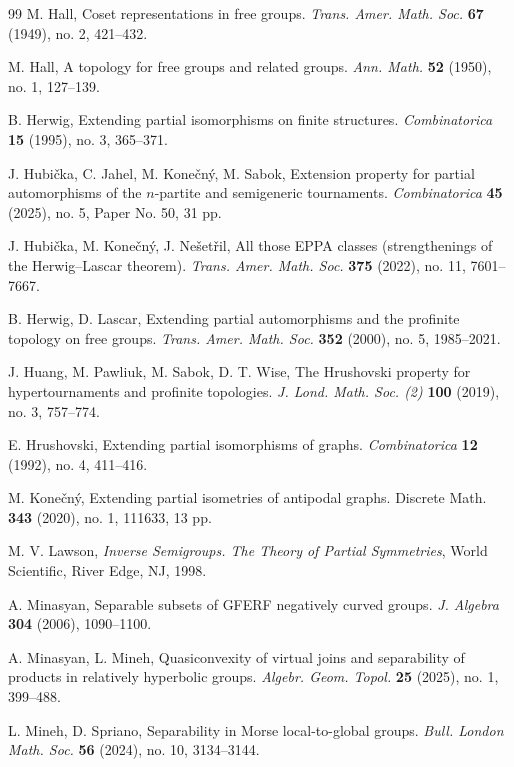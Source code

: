 \documentclass[10pt,a4paper]{amsart}
\theoremstyle{definition}
\theoremstyle{definition}
\numberwithin{equation}{section}
\begin{document}
\begin{thebibliography}{99}
M. Hall, 
Coset representations in free groups. \textit{Trans. Amer. Math. Soc.} {\bf 67} (1949), no. 2, 421--432.

M. Hall,
A topology for free groups and related groups.
\textit{Ann. Math.} {\bf 52} (1950), no. 1, 127--139.

B. Herwig, 
Extending partial isomorphisms on finite structures.
\textit{Combinatorica} {\bf 15} (1995), no. 3, 365--371.

J. Hubi\v{c}ka, C. Jahel, M. Kone\v{c}n\'{y}, M. Sabok,
Extension property for partial automorphisms of the $n$-partite and semigeneric tournaments.
\textit{Combinatorica} {\bf 45} (2025), no. 5, Paper No. 50, 31 pp.

J. Hubi\v{c}ka, M. Kone\v{c}n\'{y}, J. Ne\v{s}et\v{r}il,
All those EPPA classes (strengthenings of the Herwig--Lascar theorem).
\textit{Trans. Amer. Math. Soc.} {\bf 375} (2022), no. 11, 7601--7667.

B. Herwig, D. Lascar, Extending partial automorphisms and the profinite topology on free
groups. \textit{Trans. Amer. Math. Soc.} {\bf 352} (2000), no. 5, 1985--2021.

J. Huang, M. Pawliuk, M. Sabok, D. T. Wise, 
The Hrushovski property for hypertournaments and profinite topologies.
\textit{J. Lond. Math. Soc. (2)} {\bf 100} (2019), no. 3, 757--774.

E. Hrushovski, 
Extending partial isomorphisms of graphs.
\textit{Combinatorica} {\bf 12} (1992), no. 4, 411--416.

M. Kone\v{c}n\'{y},
Extending partial isometries of antipodal graphs.
Discrete Math. {\bf 343} (2020), no. 1, 111633, 13 pp.

M. V. Lawson, 
\textit{Inverse Semigroups. The Theory of Partial Symmetries}, 
World Scientific, River Edge, NJ, 1998.



A. Minasyan,
Separable subsets of GFERF negatively curved groups.
\textit{J. Algebra} {\bf 304} (2006), 1090--1100.

A. Minasyan, L. Mineh,
Quasiconvexity of virtual joins and separability of products in relatively hyperbolic groups.
\textit{Algebr. Geom. Topol.} {\bf 25} (2025), no. 1, 399--488.

L. Mineh, D. Spriano,
Separability in Morse local-to-global groups.
\textit{Bull. London Math. Soc.} {\bf 56} (2024), no. 10, 3134--3144.


\end{thebibliography}
\end{document}

